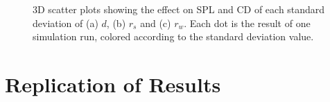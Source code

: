\begin{figure}[hbt!]\centering
    \par

    \hfill

    \caption{3D scatter plots showing the effect on SPL and CD of each
    standard deviation of
    (a) $d$, (b) $r_s$ and (c) $r_w$. Each dot is the result of one simulation run, colored
    according to the standard deviation value.}
    \label{fig:base}
\end{figure}

\section{Replication of Results}\label{sec:confirm}

